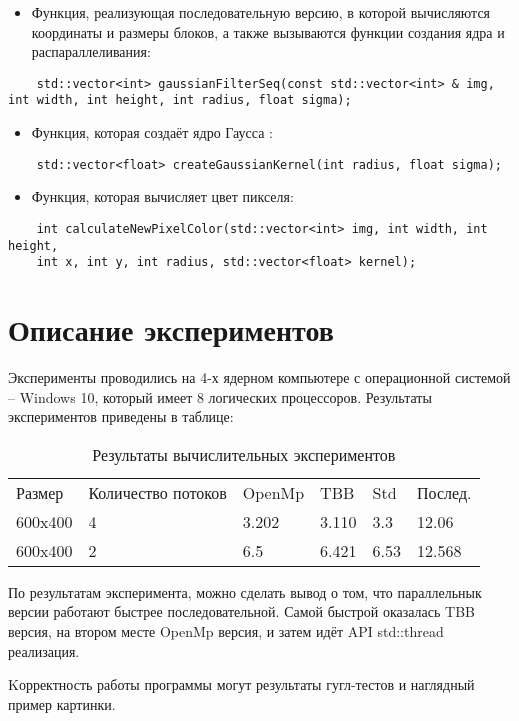 \documentclass{report}
\begin{document}
\begin{itemize}
\item Функция, реализующая последовательную версию, в которой вычисляются координаты и размеры блоков, а также вызываются функции создания ядра и распараллеливания: 
\end{itemize}
\begin{lstlisting}
	std::vector<int> gaussianFilterSeq(const std::vector<int> & img, int width, int height, int radius, float sigma);
\end{lstlisting}

\begin{itemize}
\item Функция, которая создаёт ядро Гаусса :
\end{itemize}
\begin{lstlisting}
	std::vector<float> createGaussianKernel(int radius, float sigma);
\end{lstlisting}
\begin{itemize}
\item Функция, которая вычисляет цвет пикселя: 
\end{itemize}
\begin{lstlisting}
	int calculateNewPixelColor(std::vector<int> img, int width, int height,
    int x, int y, int radius, std::vector<float> kernel);
\end{lstlisting}
\newpage

\section*{Описание экспериментов}
Эксперименты проводились на 4-х ядерном компьютере с операционной системой – Windows 10, который имеет 8 логических процессоров. Результаты экспериментов приведены в таблице:
\begin{table}[!h]
\caption{Результаты вычислительных экспериментов}
\centering
\begin{tabular}{llllll}
Размер & Количество потоков & OpenMp & TBB & Std & Послед. \\
600x400 & 4 & 3.202 & 3.110 & 3.3 & 12.06\\
600x400 & 2 & 6.5 & 6.421 & 6.53 & 12.568\\
\end{tabular}
\end{table}
\par
По результатам эксперимента, можно сделать вывод о том, что параллельнык версии работают быстрее последовательной. Самой быстрой оказалась TBB версия, на втором месте OpenMp версия, и затем идёт API std::thread реализация.
\par
Kорректность работы программы могут результаты гугл-тестов и наглядный пример картинки.
\newpage
\end{document}
